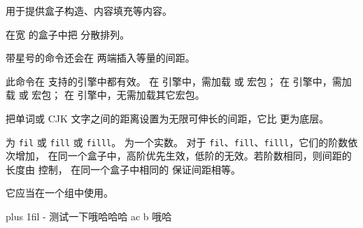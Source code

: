 \documentclass{cusdoc}
\begin{document}
 用于提供盒子构造、内容填充等内容。

\begin{function}{\spreadtext}
  \begin{syntax}
    \V\spreadtext   {} 
    \V\spreadtext *  
  \end{syntax}
在宽  的盒子中把  分散排列。

带星号的命令还会在  两端插入等量的间距。

此命令在 \CusLaTeX 支持的引擎中都有效。
在 \LuaLaTeX 引擎中，需加载  或  宏包；
在 \XeLaTeX 引擎中，需加载  或  宏包；
在 \upLaTeX 引擎中，无需加载其它宏包。
\end{function}

\begin{xample}

\stopxamplecode
\xampleprint
\end{xample}

\begin{function}{\useinfiniteskip}
  \begin{syntax}
    \V\useinfiniteskip {}
  \end{syntax}
把单词或 CJK 文字之间的距离设置为无限可伸长的间距，它比  更为底层。

 为 \texttt{fil} 或 \texttt{fill}
或 \texttt{filll}。 为一个实数。
对于 \texttt{fil}、\texttt{fill}、\texttt{filll}，它们的阶数依次增加，
在同一个盒子中，高阶优先生效，低阶的无效。若阶数相同，则间距的长度由  控制，
在同一个盒子中相同的  保证间距相等。

它应当在一个组中使用。
\end{function}

\begin{xample}
\parbox{8\ccwd}{%
   plus 1fil \parfillskip-\rightskip
  测试一下哦哈哈哈 ac b 哦哈}
\stopxamplecode
\xampleprint
\end{xample}

\begin{xample}
\stopxamplecode
\xampleprint
\end{xample}
\end{document}

